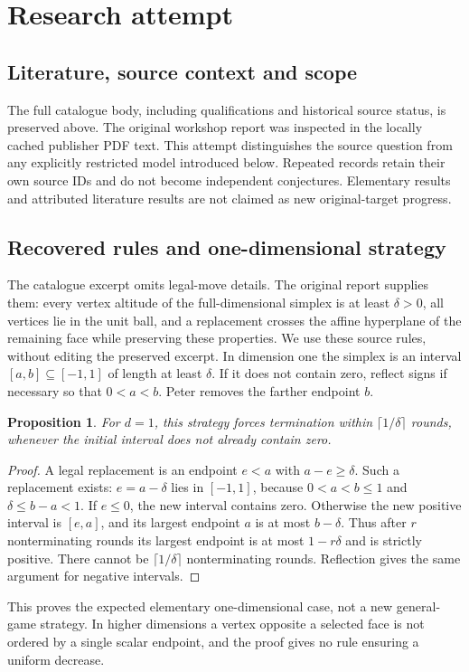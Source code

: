 \documentclass[11pt]{article}
\newtheorem{proposition}{Proposition}
\begin{document}
\section{Research attempt}
\subsection{Literature, source context and scope}
The full catalogue body, including qualifications and historical source status, is preserved above. The original workshop report was inspected in the locally cached publisher PDF text. This attempt distinguishes the source question from any explicitly restricted model introduced below. Repeated records retain their own source IDs and do not become independent conjectures. Elementary results and attributed literature results are not claimed as new original-target progress.

\subsection{Recovered rules and one-dimensional strategy}
The catalogue excerpt omits legal-move details. The original report supplies them: every vertex altitude of the full-dimensional simplex is at least $\delta>0$, all vertices lie in the unit ball, and a replacement crosses the affine hyperplane of the remaining face while preserving these properties. We use these source rules, without editing the preserved excerpt.
In dimension one the simplex is an interval $[a,b]\subseteq[-1,1]$ of length at least $\delta$. If it does not contain zero, reflect signs if necessary so that $0<a<b$. Peter removes the farther endpoint $b$.
\begin{proposition}
For $d=1$, this strategy forces termination within $\lceil1/\delta\rceil$ rounds, whenever the initial interval does not already contain zero.
\end{proposition}
\begin{proof}
A legal replacement is an endpoint $e<a$ with $a-e\ge\delta$. Such a replacement exists: $e=a-\delta$ lies in $[-1,1]$, because $0<a<b\le1$ and $\delta\le b-a<1$. If $e\le0$, the new interval contains zero. Otherwise the new positive interval is $[e,a]$, and its largest endpoint $a$ is at most $b-\delta$. Thus after $r$ nonterminating rounds its largest endpoint is at most $1-r\delta$ and is strictly positive. There cannot be $\lceil1/\delta\rceil$ nonterminating rounds. Reflection gives the same argument for negative intervals.
\end{proof}
This proves the expected elementary one-dimensional case, not a new general-game strategy. In higher dimensions a vertex opposite a selected face is not ordered by a single scalar endpoint, and the proof gives no rule ensuring a uniform decrease.
\end{document}
